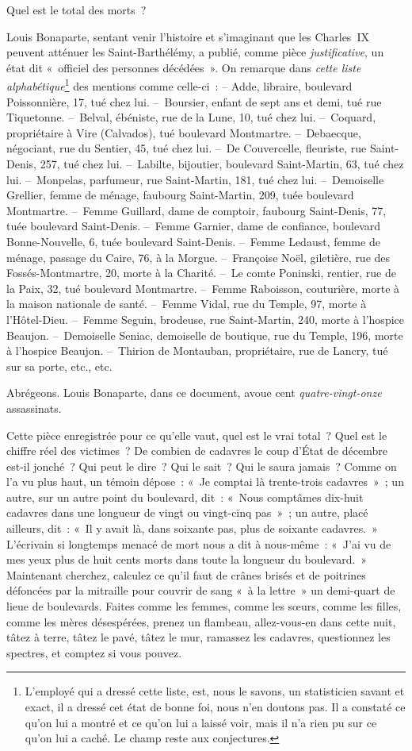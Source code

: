 \documentclass[french,twoside]{book} %
\begin{document}
Quel est le total des morts ?\par
Louis Bonaparte, sentant venir l’histoire et s’imaginant que les Charles IX peuvent atténuer les Saint-Barthélémy, a publié, comme pièce \emph{justificative}, un état dit « officiel des personnes décédées ». On remarque dans \emph{cette liste alphabétique}\footnote{L’employé qui a dressé cette liste, est, nous le savons, un statisticien savant et exact, il a dressé cet état de bonne foi, nous n’en doutons pas. Il a constaté ce qu’on lui a montré et ce qu’on lui a laissé voir, mais il n’a rien pu sur ce qu’on lui a caché. Le champ reste aux conjectures.} des mentions comme celle-ci : – Adde, libraire, boulevard Poissonnière, 17, tué chez lui. – Boursier, enfant de sept ans et demi, tué rue Tiquetonne. – Belval, ébéniste, rue de la Lune, 10, tué chez lui. – Coquard, propriétaire à Vire (Calvados), tué boulevard Montmartre. – Debaecque, négociant, rue du Sentier, 45, tué chez lui. – De Couvercelle, fleuriste, rue Saint-Denis, 257, tué chez lui. – Labilte, bijoutier, boulevard Saint-Martin, 63, tué chez lui. – Monpelas, parfumeur, rue Saint-Martin, 181, tué chez lui. – Demoiselle Grellier, femme de ménage, faubourg Saint-Martin, 209, tuée boulevard Montmartre. – Femme Guillard, dame de comptoir, faubourg Saint-Denis, 77, tuée boulevard Saint-Denis. – Femme Garnier, dame de confiance, boulevard Bonne-Nouvelle, 6, tuée boulevard Saint-Denis. – Femme Ledaust, femme de ménage, passage du Caire, 76, à la Morgue. – Françoise Noël, giletière, rue des Fossés-Montmartre, 20, morte à la Charité. – Le comte Poninski, rentier, rue de la Paix, 32, tué boulevard Montmartre. – Femme Raboisson, couturière, morte à la maison nationale de santé. – Femme Vidal, rue du Temple, 97, morte à l’Hôtel-Dieu. – Femme Seguin, brodeuse, rue Saint-Martin, 240, morte à l’hospice Beaujon. – Demoiselle Seniac, demoiselle de boutique, rue du Temple, 196, morte à l’hospice Beaujon. – Thirion de Montauban, propriétaire, rue de Lancry, tué sur sa porte, etc., etc.\par
Abrégeons. Louis Bonaparte, dans ce document, avoue cent \emph{quatre-vingt-onze} assassinats.\par
Cette pièce enregistrée pour ce qu’elle vaut, quel est le vrai total ? Quel est le chiffre réel des victimes ? De combien de cadavres le coup d’État de décembre est-il jonché ? Qui peut le dire ? Qui le sait ? Qui le saura jamais ? Comme on l’a vu plus haut, un témoin dépose : « Je comptai là trente-trois cadavres » ; un autre, sur un autre point du boulevard, dit : « Nous comptâmes dix-huit cadavres dans une longueur de vingt ou vingt-cinq pas » ; un autre, placé ailleurs, dit : « Il y avait là, dans soixante pas, plus de soixante cadavres. » L’écrivain si longtemps menacé de mort nous a dit à nous-même : « J’ai vu de mes yeux plus de huit cents morts dans toute la longueur du boulevard. » Maintenant cherchez, calculez ce qu’il faut de crânes brisés et de poitrines défoncées par la mitraille pour couvrir de sang « à la lettre » un demi-quart de lieue de boulevards. Faites comme les femmes, comme les sœurs, comme les filles, comme les mères désespérées, prenez un flambeau, allez-vous-en dans cette nuit, tâtez à terre, tâtez le pavé, tâtez le mur, ramassez les cadavres, questionnez les spectres, et comptez si vous pouvez.\par
\end{document}
